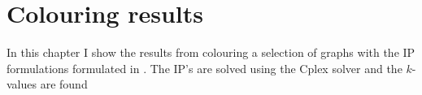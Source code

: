 \chapter{Colouring results}
In this chapter I show the results from colouring a selection of graphs with the IP formulations formulated in . The IP's are solved using the Cplex solver and the $k$-values are found 
